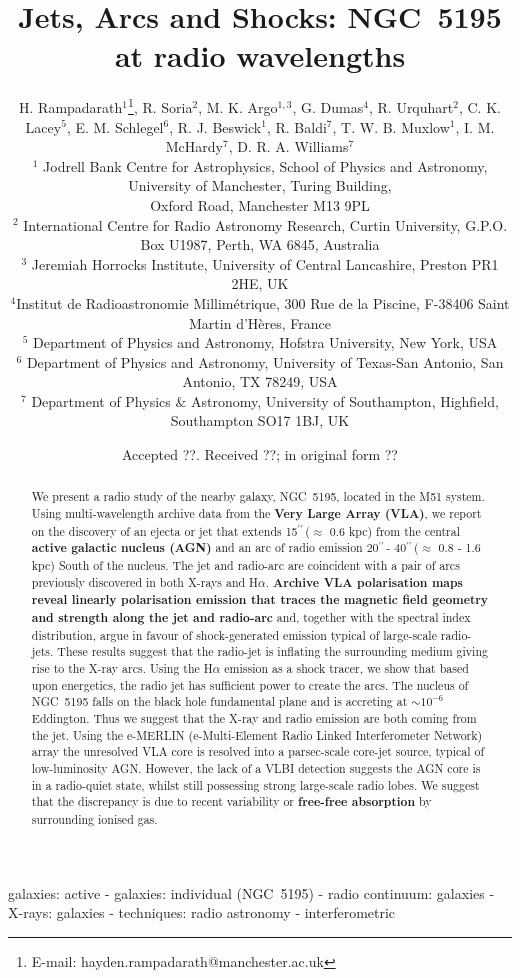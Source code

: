 \documentclass[fleqn,usenatbib]{mnras}
\title{Jets, Arcs and Shocks: NGC~5195 at radio wavelengths}
\author[H. Rampadarath et al]{H. Rampadarath$^{1}$\thanks{E-mail: hayden.rampadarath@manchester.ac.uk}, R. Soria$^{2}$, M. K. Argo$^{1,3}$,  G. Dumas$^{4}$, R. Urquhart$^{2}$, C. K. Lacey$^{5}$, 
\newauthor
E. M. Schlegel$^{6}$, R. J. Beswick$^{1}$,  R. Baldi$^{7}$, T. W. B. Muxlow$^{1}$, I. M. McHardy$^{7}$,
\newauthor
D. R. A. Williams$^{7}$ \\
$^{1}$ Jodrell Bank Centre for Astrophysics, School of Physics and Astronomy, University of Manchester, Turing Building, \\ Oxford Road, Manchester M13 9PL\\
$^{2}$ International Centre for Radio Astronomy Research, Curtin University, G.P.O. Box U1987, Perth, WA 6845, Australia\\
$^{3}$ Jeremiah Horrocks Institute, University of Central Lancashire, Preston PR1 2HE, UK\\
$^{4}$Institut de Radioastronomie Millim\'{e}trique, 300 Rue de la Piscine, F-38406 Saint Martin d'Hères, France\\
$^{5}$ Department of Physics and Astronomy, Hofstra University, New York, USA \\
$^{6}$ Department of Physics and Astronomy, University of Texas-San Antonio, San Antonio, TX 78249, USA\\
$^{7}$ Department of Physics $\&$ Astronomy, University of Southampton, Highfield, Southampton SO17 1BJ, UK}
\def\arcs{$^{\prime\prime}\,$}
\begin{document}
\setlength{\parskip}{0pt}

\date{Accepted ??. Received ??; in original form ??}

\pagerange{\pageref{firstpage}--\pageref{lastpage}} 

\maketitle

\label{firstpage}

\begin{abstract}
We present a radio study of the nearby galaxy, NGC~5195, located in the M51 system. Using 
multi-wavelength archive data from the \textbf{Very Large Array (VLA)}, we report on the discovery of an ejecta or jet that extends 15\arcs ($\approx$ 0.6 kpc) from the central \textbf{active galactic nucleus (AGN)} and an arc of radio emission 20\arcs - 40\arcs ($\approx$ 0.8 - 1.6 kpc)  South of the nucleus. The jet and radio-arc are coincident with a pair of arcs previously 
discovered in both X-rays and H$\alpha$. \textbf{Archive VLA polarisation maps reveal linearly polarisation emission 
that traces the magnetic field geometry	and	strength along the jet and radio-arc} and, together with the spectral index distribution, argue in favour of shock-generated emission typical of large-scale radio-jets. These results suggest that the radio-jet is inflating the surrounding medium giving rise to the 
X-ray arcs. Using the H$\alpha$ emission as a shock tracer, we show that based upon energetics, the radio jet has sufficient power to create the arcs. The nucleus of NGC~5195 falls on the black hole fundamental plane and is accreting at $\sim 10^{-6}$ Eddington. Thus we suggest that the X-ray and radio emission are both coming from the jet. Using the e-MERLIN (e-Multi-Element Radio Linked Interferometer Network) array the unresolved VLA core is resolved into a parsec-scale core-jet source, typical of low-luminosity AGN. However, the lack of a VLBI detection suggests the AGN core is in a radio-quiet state, whilst still possessing strong large-scale radio lobes. We suggest that the discrepancy is due to recent variability or \textbf{free-free absorption} by surrounding ionised gas.

\end{abstract}

\begin{keywords}
galaxies: active - galaxies: individual (NGC~5195) - radio continuum: galaxies - X-rays: galaxies - techniques: radio astronomy - interferometric
\end{keywords}
\end{document}
